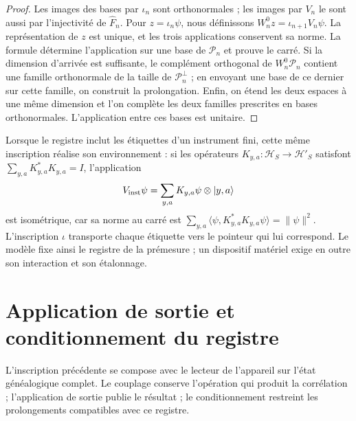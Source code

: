 \begin{proof}
Les images des bases par \(\iota_n\) sont orthonormales ; les
images par \(V_n\) le sont aussi par l'injectivité de
\(\widehat F_n\). Pour \(z=\iota_n\psi\), nous définissons
\(W_n^0z=\iota_{n+1}V_n\psi\). La représentation de \(z\) est unique,
et les trois applications conservent sa norme. La formule détermine l'application sur
une base de \(\mathcal P_n\) et prouve le carré.
Si la dimension d'arrivée est suffisante, le complément orthogonal de
\(W_n^0\mathcal P_n\) contient une famille orthonormale de la taille de
\(\mathcal P_n^\perp\) ; en envoyant une base de ce dernier sur cette famille,
on construit la prolongation. Enfin, on étend les deux espaces à
une même dimension et l'on complète les deux familles prescrites en bases
orthonormales. L'application entre ces bases est unitaire.
\end{proof}

Lorsque le registre inclut les étiquettes d'un instrument fini, cette même inscription réalise son environnement : si les opérateurs \(K_{y,a}:\mathcal H_S\to\mathcal H'_S\) satisfont \(\sum_{y,a}K_{y,a}^*K_{y,a}=I\), l'application
\[
 V_{\rm inst}\psi=\sum_{y,a}K_{y,a}\psi\otimes|y,a\rangle
\]
est isométrique, car sa norme au carré est
\(\sum_{y,a}\langle\psi,K_{y,a}^*K_{y,a}\psi\rangle=\|\psi\|^2\).
L'inscription \(\iota\) transporte chaque étiquette vers le pointeur qui lui
correspond. Le modèle fixe ainsi le registre de la prémesure ; un
dispositif matériel exige en outre son interaction et son étalonnage.


\section{Application de sortie et conditionnement du registre}
\label{x_reciprocidad:vii:sec:salida-condicionamiento}

L’inscription précédente se compose avec le lecteur de l’appareil sur
l’état généalogique complet. Le couplage conserve l’opération qui
produit la corrélation ; l’application de sortie publie le résultat ; le
conditionnement restreint les prolongements compatibles avec ce registre.

